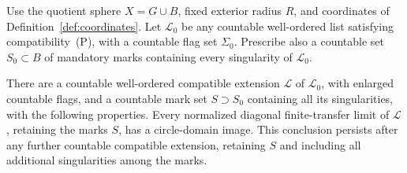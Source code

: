 \begin{theorem}\label{thm:retained-tests}
Use the quotient sphere $X=G\cup B$, fixed exterior radius $R$, and
coordinates of Definition~\ref{def:coordinates}.  Let $\mathscr L_0$
be any countable well-ordered list satisfying compatibility~\textup{(P)},
with a countable flag set $\Sigma_0$.  Prescribe also a countable set
$S_0\subset B$ of mandatory marks containing every singularity of
$\mathscr L_0$.

There are a countable well-ordered compatible extension $\mathscr L$
of $\mathscr L_0$, with enlarged countable flags, and a countable mark
set $S\supset S_0$ containing all its singularities, with the following
properties.  Every normalized diagonal finite-transfer limit of
$\mathscr L$, retaining the marks $S$, has a circle-domain image.
This conclusion persists after any further countable compatible
extension, retaining $S$ and including all additional singularities among
the marks.


\end{theorem}
